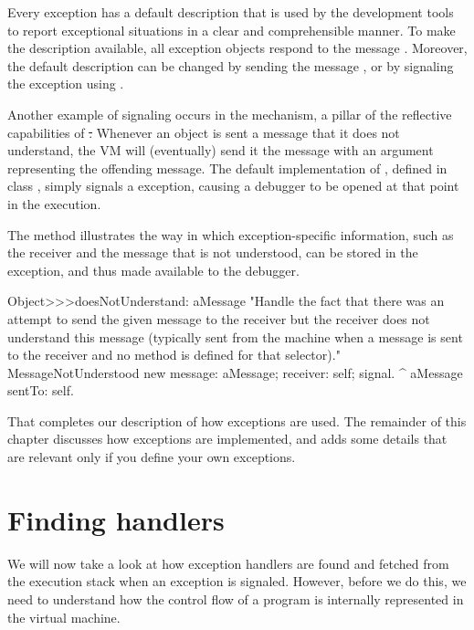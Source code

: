 \documentclass[a4paper,10pt,twoside]{book}
\begin{document}
Every exception has a default description that is used by the development tools to report exceptional situations in a clear and comprehensible manner. To make the description available, all exception objects respond to the message . Moreover, the default description can be changed by sending the message , or by signaling the exception using .

Another example of signaling occurs in the  mechanism, a pillar of the reflective capabilities of \st. Whenever an object is sent a message that it does not understand, the VM will (eventually) send it the message  with an argument representing the offending message. The default implementation of , defined in class , simply signals a  exception, causing a debugger to be opened at that point in the execution.

The  method illustrates the way in which exception-specific information, such as the receiver and the message that is not understood, can be stored in the exception, and thus made available to the debugger.

\begin{code}{}
Object>>>doesNotUnderstand: aMessage 
	 "Handle the fact that there was an attempt to send the given message to the receiver but the receiver does not understand this message (typically sent from the machine when a message is sent to the receiver and no method is defined for that selector)."
	MessageNotUnderstood new 
		message: aMessage;
		receiver: self;
		signal.
	^ aMessage sentTo: self.
\end{code}

That completes our description of how exceptions are used.  The remainder of this chapter discusses how exceptions are implemented, and adds some details that are relevant only if you define your own exceptions.



\section{Finding handlers}

We will now take a look at how exception handlers are found and fetched from the execution stack when an exception is signaled. 
However, before we do this, we need to understand how the control flow of a program is internally represented in the virtual machine.
\end{document}
